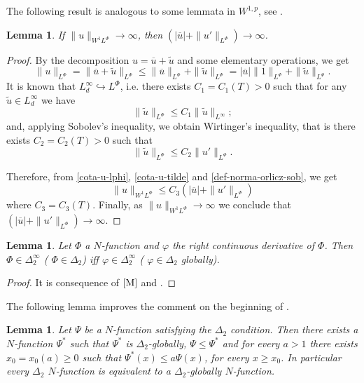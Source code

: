 \documentclass[twoside]{article}
\newtheorem{lem}[thm]{Lemma}
\theoremstyle{remark}
\newcommand{\orlnor}{\|_{L^{\Phi}}}
\newcommand{\lphi}{L^{\Phi}}
\newcommand{\sobnor}{\|_{W^{1}\lphi}}
\renewcommand{\leq}{\leqslant}
\renewcommand{\geq}{\geqslant}
\begin{document}
The following result is analogous to some lemmata in $W^{1,p}$, see \cite{xu2007some}.
\begin{lem}\label{infinito-a-prom-upunto}
If $\|u\sobnor\to \infty$, then $(|\overline{u}|+\|u'\orlnor)\to \infty$.
\end{lem}

\begin{proof}
By the decomposition $u=\overline{u}+\tilde{u}$ and some elementary operations,
we get
\begin{equation}\label{cota-u-lphi}
\|u\orlnor=
\|\overline{u}+\tilde{u}\orlnor\leq
\|\overline{u}\orlnor+\|\tilde{u}\orlnor=
|\overline{u}|\|1\orlnor+\|\tilde{u}\orlnor.
\end{equation}
It is known that $L^{\infty}_d\hookrightarrow\lphi$, i.e.
there exists $C_1=C_1(T)>0$ such that for any $\tilde{u}\in L^{\infty}_d$ we have
\[
\|\tilde{u}\orlnor
\leq
C_1 \|\tilde{u}\|_{L^{\infty}};
\]
and, applying  Sobolev's inequality,  we obtain Wirtinger's inequality, 
that is there exists $C_2=C_2(T)>0$ such that
\begin{equation}\label{cota-u-tilde}
\|\tilde{u}\orlnor
\leq
C_2\|u'\orlnor.
\end{equation}

Therefore, from \eqref{cota-u-lphi}, \eqref{cota-u-tilde} and \eqref{def-norma-orlicz-sob},
we get
\[
\|u\sobnor\leq
C_3(|\overline{u}|+\|u'\orlnor)
\]
where $C_3=C_3(T)$. Finally, as $\|u\sobnor\to \infty$ we conclude that
$(|\overline{u}|+\|u'\orlnor)\to \infty$.
\end{proof}

\begin{lem}\label{lema:delta_2 y der} Let $\Phi$ a $N$-function and $\varphi$ the right continuous derivative of $\Phi$. Then $\Phi\in\Delta_2^{\infty}$ (
$\Phi\in\Delta_2$) iff $\varphi\in\Delta_2^{\infty}$ (
$\varphi\in\Delta_2$ globally).
\end{lem}
\begin{proof}  It is consequence of $\cite[Th. 11.7]{M}$ and \cite[Remark 5, p. 87]{M}.

\end{proof}

The following lemma improves the comment on the beginning of \cite[p. 24]{KR}.

\begin{lem}\label{lem:delta2-equiv-delta2-global} Let $\Psi$ be a $N$-function satisfying the $\Delta_2$ condition. Then there exists a $N$-function $\Psi^*$  such that $\Psi^*$ is $\Delta_2$-globally, $\Psi\leq\Psi^*$ and for every $a>1$ there exists $x_0=x_0(a)\geq 0$ such that $\Psi^*(x)\leq a\Psi(x)$, for every $x\geq x_0$.  In particular every $\Delta_2$ $N$-function is equivalent to a $\Delta_2$-globally $N$-function.
\end{lem}
\end{document}
